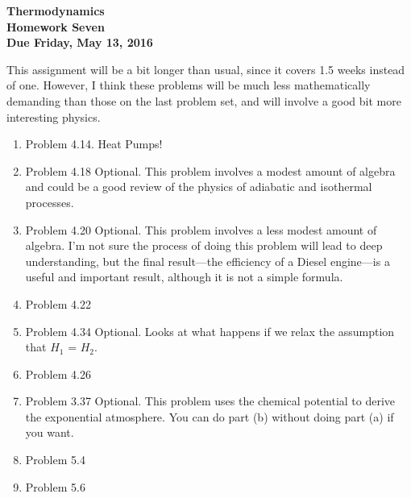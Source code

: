 \documentclass[12pt]{article}
\begin{document}
\pagestyle{empty}
 
\begin{center}
{\large {\bf Thermodynamics}}\\
\medskip
{\large {\bf Homework Seven}}\\
\medskip
{ {\bf Due Friday, May 13, 2016}}\\
\end{center}

\noindent This assignment will be a bit longer than usual, since it
covers 1.5 weeks instead of one.  However, I think these problems will
be much less mathematically demanding than those on the last problem
set, and will involve a good bit more interesting physics.

\begin{enumerate}

  \item Problem 4.14.  Heat Pumps!
  \item Problem 4.18  Optional.  This problem involves a modest amount
    of algebra and could be a good review of the physics of adiabatic
    and isothermal processes. 
  \item Problem 4.20  Optional.  This problem involves a less modest
    amount of algebra.  I'm not sure the process of doing this problem
    will lead to deep understanding, but the final result---the
    efficiency of a Diesel engine---is a useful and important result,
    although it is not a simple formula.  
  \item Problem 4.22
  \item Problem 4.34 Optional. Looks at what happens if we relax the
    assumption that $H_1$ = $H_2$. 
  \item Problem 4.26
  \item Problem 3.37 Optional. This problem uses the chemical
    potential to derive the exponential atmosphere.  You can do part
    (b) without doing part (a) if you want.
  \item Problem 5.4
  \item Problem 5.6

\end{enumerate}
\end{document}
